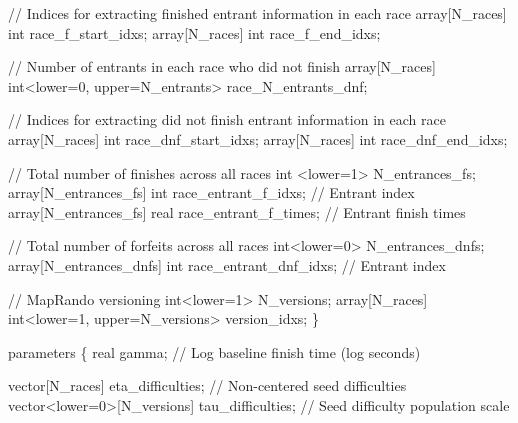 \documentclass[
  letterpaper,
  DIV=11,
  numbers=noendperiod]{scrartcl}
\newenvironment{Shaded}{\begin{snugshade}}{\end{snugshade}}
\newcommand{\CommentTok}[1]{\textcolor[rgb]{0.37,0.37,0.37}{#1}}
\newcommand{\DataTypeTok}[1]{\textcolor[rgb]{0.68,0.00,0.00}{#1}}
\newcommand{\DecValTok}[1]{\textcolor[rgb]{0.68,0.00,0.00}{#1}}
\newcommand{\KeywordTok}[1]{\textcolor[rgb]{0.00,0.23,0.31}{#1}}
\newcommand{\NormalTok}[1]{\textcolor[rgb]{0.00,0.23,0.31}{#1}}
\begin{document}
\begin{codelisting}
\begin{Shaded}
\begin{Highlighting}[]
  \CommentTok{// Indices for extracting finished entrant information in each race}
  \DataTypeTok{array}\NormalTok{[N\_races] }\DataTypeTok{int}\NormalTok{ race\_f\_start\_idxs;}
  \DataTypeTok{array}\NormalTok{[N\_races] }\DataTypeTok{int}\NormalTok{ race\_f\_end\_idxs;}

  \CommentTok{// Number of entrants in each race who did not finish}
  \DataTypeTok{array}\NormalTok{[N\_races] }\DataTypeTok{int}\NormalTok{\textless{}}\KeywordTok{lower}\NormalTok{=}\DecValTok{0}\NormalTok{, }\KeywordTok{upper}\NormalTok{=N\_entrants\textgreater{} race\_N\_entrants\_dnf;}

  \CommentTok{// Indices for extracting did not finish entrant information in each race}
  \DataTypeTok{array}\NormalTok{[N\_races] }\DataTypeTok{int}\NormalTok{ race\_dnf\_start\_idxs;}
  \DataTypeTok{array}\NormalTok{[N\_races] }\DataTypeTok{int}\NormalTok{ race\_dnf\_end\_idxs;}

  \CommentTok{// Total number of finishes across all races}
  \DataTypeTok{int}\NormalTok{ \textless{}}\KeywordTok{lower}\NormalTok{=}\DecValTok{1}\NormalTok{\textgreater{} N\_entrances\_fs;}
  \DataTypeTok{array}\NormalTok{[N\_entrances\_fs] }\DataTypeTok{int}\NormalTok{ race\_entrant\_f\_idxs;   }\CommentTok{// Entrant index}
  \DataTypeTok{array}\NormalTok{[N\_entrances\_fs] }\DataTypeTok{real}\NormalTok{ race\_entrant\_f\_times; }\CommentTok{// Entrant finish times}

  \CommentTok{// Total number of forfeits across all races}
  \DataTypeTok{int}\NormalTok{\textless{}}\KeywordTok{lower}\NormalTok{=}\DecValTok{0}\NormalTok{\textgreater{} N\_entrances\_dnfs;}
  \DataTypeTok{array}\NormalTok{[N\_entrances\_dnfs] }\DataTypeTok{int}\NormalTok{ race\_entrant\_dnf\_idxs; }\CommentTok{// Entrant index}

  \CommentTok{// MapRando versioning}
  \DataTypeTok{int}\NormalTok{\textless{}}\KeywordTok{lower}\NormalTok{=}\DecValTok{1}\NormalTok{\textgreater{} N\_versions;}
  \DataTypeTok{array}\NormalTok{[N\_races] }\DataTypeTok{int}\NormalTok{\textless{}}\KeywordTok{lower}\NormalTok{=}\DecValTok{1}\NormalTok{, }\KeywordTok{upper}\NormalTok{=N\_versions\textgreater{} version\_idxs;}
\NormalTok{\}}

\KeywordTok{parameters}\NormalTok{ \{}
  \DataTypeTok{real}\NormalTok{ gamma;                       }\CommentTok{// Log baseline finish time (log seconds)}

  \DataTypeTok{vector}\NormalTok{[N\_races] eta\_difficulties; }\CommentTok{// Non{-}centered seed difficulties}
  \DataTypeTok{vector}\NormalTok{\textless{}}\KeywordTok{lower}\NormalTok{=}\DecValTok{0}\NormalTok{\textgreater{}[N\_versions] tau\_difficulties; }\CommentTok{// Seed difficulty population scale}


\end{Highlighting}
\end{Shaded}
\end{codelisting}
\end{document}
